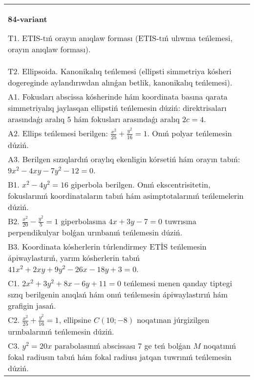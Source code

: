 \documentclass{article}
\begin{document}
\begin{tabular}{m{17cm}}
\textbf{84-variant}
\newline

T1. ETIS-tıń orayın anıqlaw forması (ETIS-tıń ulıwma teńlemesi, orayın anıqlaw forması).\\

T2. Ellipsoida. Kanonikalıq teńlemesi (ellipsti simmetriya kósheri dogereginde aylandırıwdan alınǵan betlik, kanonikalıq teńlemesi).\\

A1. Fokusları abscissa kósherinde hám koordinata basına qarata simmetriyalıq jaylasqan ellipstiń teńlemesin dúziń: direktrisaları arasındaǵı aralıq $5$ hám fokusları arasındaǵı aralıq $2 c=4$.\\

A2. Ellips teńlemesi berilgen: $\frac{x^2}{25}+\frac{y^2}{16}=1$. Onıń polyar teńlemesin dúziń.\\

A3. Berilgen sızıqlardıń oraylıq ekenligin kórsetiń hám orayın tabıń: $9 x^{2}-4 xy-7 y^{2}-12=0$.\\

B1. $x^{2} - 4y^{2} = 16$ giperbola berilgen. Onıń ekscentrisitetin, fokuslarınıń koordinataların tabıń hám asimptotalarınıń teńlemelerin dúziń.\\

B2. $\frac{x^{2}}{20} - \frac{y^{2}}{5} = 1$ giperbolasına $4x + 3y - 7 = 0$ tuwrısına perpendikulyar bolǵan urınbanıń teńlemesin dúziń.  \\

B3. Koordinata kósherlerin túrlendirmey ETİS teńlemesin ápiwaylastırıń, yarım kósherlerin tabıń $41x^{2} + 2xy + 9y^{2} - 26x - 18y + 3 = 0$.  \\

C1. $2x^{2} + 3y^{2} + 8x - 6y + 11 = 0$ teńlemesi menen qanday tiptegi sızıq berilgenin anıqlań hám onıń teńlemesin ápiwaylastırıń hám grafigin jasań.  \\

C2. $\frac{x^{2}}{25} + \frac{y^{2}}{16} = 1$, ellipsine $C(10; - 8)$ noqatınan júrgizilgen urınbalarınıń teńlemesin dúziń.  \\

C3. $y^{2} = 20x$ parabolasınıń abscissası 7 ge teń bolǵan $M$ noqatınıń fokal radiusın tabıń hám fokal radiusı jatqan tuwrınıń teńlemesin dúziń.  \\

\end{tabular}
\vspace{1cm}
\end{document}
